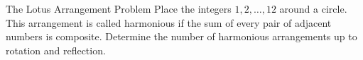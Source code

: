 \begin{problem}{The Lotus Arrangement Problem}
    Place the integers \(1,2,\dots,12\) around a circle. This arrangement is called harmonious if the sum of every pair of adjacent numbers is composite. Determine the number of harmonious arrangements up to rotation and reflection.
    
\end{problem}
